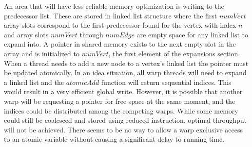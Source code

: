 \documentclass[12pt,twocolumn]{article}
\begin{document}
An area that will have less reliable memory optimization is writing to the predecessor list. These are stored in linked list structure where the first $numVert$ array slots correspond to the first predecessor found for the vertex with index $n$ and array slots $numVert$ through $numEdge$ are empty space for any linked list to expand into. A pointer in shared memory exists to the next empty slot in the array and is initialized to $numVert$, the first element of the expansions section. When a thread needs to add a new node to a vertex's linked list the pointer must be updated atomically. In an idea situation, all warp threads will need to expand a linked list and the $atomicAdd$ function will return sequential indices. This would result in a very efficient global write. However, it is possible that another warp will be requesting a pointer for free space at the same moment, and the indices could be distributed among the competing warps. While some memory could still be coalesced and stored using reduced instruction, optimal throughput will not be achieved. There seems to be no way to allow a warp exclusive access to an atomic variable without causing a significant delay to running time.
\end{document}
